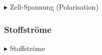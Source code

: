 \documentclass[onecolumn,10pt,titlepage]{article}
\begin{document}
$\blacktriangleright$ Zell-Spannung (Polarisation)

\subsubsection{Stoffströme}

$\blacktriangleright$ Stoffströme

%
%
%
\end{document}
